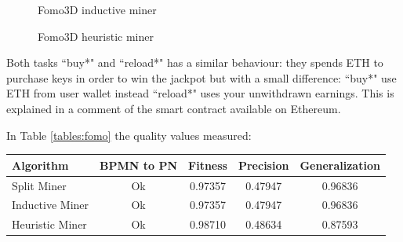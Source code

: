 \begin{figure}[!ht]
    \centering
    \caption{Fomo3D inductive miner}
    \label{images:fomo_inductive}
\end{figure}

\begin{figure}[!ht]
    \centering
    \caption{Fomo3D heuristic miner}
    \label{images:fomo_heuristic}
\end{figure}

Both tasks ``buy*" and ``reload*" has a similar behaviour: they spends ETH to purchase keys in order to win the jackpot but with a 
small difference: ``buy*" use ETH from user wallet instead ``reload*" uses your unwithdrawn earnings. This is explained in a 
comment of the smart contract available on Ethereum.

In Table \ref{tables:fomo} the quality values measured:

\begin{center}
    \label{tables:fomo}
    \begin{tabular}{ | l | c | c | c | c |}
        \hline
        \textbf{Algorithm} & \textbf{BPMN to PN} & \textbf{Fitness} & \textbf{Precision} & \textbf{Generalization} \\ 
        \hline
        Split Miner & Ok & 0.97357 & 0.47947 & 0.96836 \\ 
        \hline
        Inductive Miner & Ok & 0.97357 & 0.47947 & 0.96836 \\
        \hline
        Heuristic Miner & Ok & 0.98710 & 0.48634 & 0.87593 \\
        \hline
    \end{tabular}
\end{center}

